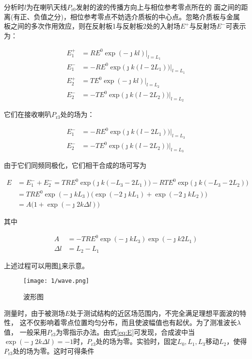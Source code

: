 \documentclass[../main]{subfiles}
\begin{document}
分析时$ l $为在喇叭天线$ P_\mathrm{r0} $发射的波的传播方向上与相位参考零点所在的
面之间的距离(有正、负值之分)，相位参考零点不妨选介质板的中心点。忽略介质板与金属
板之间的多次作用效应，则在反射板1与反射板2处的入射场$ E^+ $与反射场$ E^- $可表示
为：

\begin{align}
	E_1^+ & = RE^0 \exp(-\jmath kl) |_{l = L_1}\\
	E_1^- & = -RE^0 \exp\big(\jmath k(l - 2L_1)\big) |_{l = L_1}\\
	E_2^+ & = TE^0 \exp(-\jmath kl) |_{l = L_2}\\
	E_2^- & = -TE^0 \exp\big(\jmath k(l - 2L_2)\big) |_{l = L_2}
\end{align}

它们在接收喇叭$ P_\mathrm{r3} $处的场为：

\begin{align}
	E_1^- & = -RE^0 \exp\big(\jmath k(l - 2L_1)\big) |_{l = L_3}\\
	E_2^- & = -TE^0 \exp\big(\jmath k(l - 2L_2)\big) |_{l = L_3}
\end{align}

由于它们同频同极化，它们相干合成的场可写为

\begin{align}
	\label{eq:E}
	E & = E_1^- + E_2^- = TRE^0\exp\big(\jmath k(-L_3 - 2L_1)\big) - RTE^0
	\exp\big(\jmath k(-L_3 - 2L_2)\big)\\
	  & = TRE^0\exp(-\jmath kL_3)\big(\exp(-2\jmath kL_1) + \exp(-2\jmath
	  kL_2)\big)\\
	  & = A \big(1 + \exp(-\jmath 2k\Delta l)\big)
\end{align}

其中

\begin{align}
	A & = -TRE^0\exp(-\jmath kL_3)\exp(-\jmath k 2L_1)\\
	\Delta l & = L_2 - L_1
\end{align}

上述过程可以用图\ref{fig:波形图}来示意。

\begin{figure}[htbp]
	\centering
	\texttt{[image: 1/wave.png]}
	\caption{波形图}
	\label{fig:波形图}
\end{figure}

测量时，由于被测场$ E $处于测试结构的近区场范围内，不完全满足理想平面波的特性，
这不仅影响着零点位置均匀分布，而且使波幅值也有起伏。为了测准波长$ \lambda $值，
一般采用$ P_\mathrm{r3} $为零指示办法。由式\ref{eq:E}可发现，合成波中当$ \exp(
-\jmath 2k\Delta l ) = - 1 $时，$ P_\mathrm{r3} $处的场为零。实验时，固定$ L_0,
L_1, L_3 $移动$ L_2 $，使得$ P_\mathrm{r3} $处的场为零。这时可得条件
\end{document}
